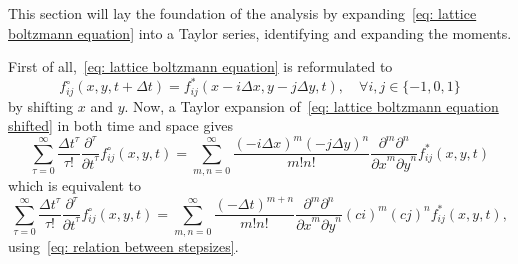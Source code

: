 This section will lay the foundation of the analysis by expanding~\eqref{eq: lattice boltzmann equation} into a Taylor series, identifying and expanding the moments.

First of all,~\eqref{eq: lattice boltzmann equation} is reformulated to
\begin{equation}
  \label{eq: lattice boltzmann equation shifted}
  f_{ij}^{\circ}(x, y, t + \Delta t) = f^*_{ij}(x - i \Delta x , y - j\Delta y, t), \quad\forall i,j\in \{-1, 0, 1\}
\end{equation}
by shifting $x$ and $y$. Now, a Taylor expansion of~\eqref{eq: lattice boltzmann equation shifted} in both time and space gives
\begin{equation*}
  \sum_{\tau = 0}^\infty \frac{{\Delta t}^\tau }{\tau!} \frac{\partial^\tau}{{\partial t}^\tau} f_{ij}^{\circ}(x, y, t) =
  \sum_{m,n = 0}^\infty \frac{{(-i\Delta x)}^m{(-j\Delta y)}^n} {m!n!} \frac{\partial^m \partial^n}{ {\partial x}^m{\partial y}^n} f^*_{ij}(x, y, t)
\end{equation*}
which is equivalent to
\begin{equation}
  \label{eq: Taylor LB1}
  \sum_{\tau = 0}^\infty \frac{{\Delta t}^\tau }{\tau!} \frac{\partial^\tau}{{\partial t}^\tau} f_{ij}^{\circ}(x, y, t) =
    \sum_{m,n = 0}^\infty \frac{{(-\Delta t)}^{m+n}} {m!n!} \frac{\partial^m \partial^n}{ {\partial x}^m{\partial y}^n} {(ci)}^m {(cj)}^n f^*_{ij}(x, y, t),
\end{equation}
using~\eqref{eq: relation between stepsizes}.

